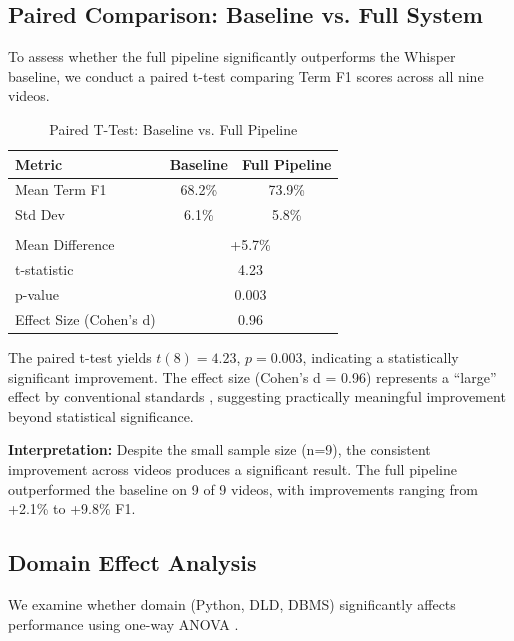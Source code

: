 \subsection{Paired Comparison: Baseline vs. Full System}

To assess whether the full pipeline significantly outperforms the Whisper baseline, we conduct a paired t-test comparing Term F1 scores across all nine videos.

\begin{table}[h]
\centering
\caption{Paired T-Test: Baseline vs. Full Pipeline}
\label{tab:paired_ttest}
\begin{tabular}{|l|c|c|}
\hline
\textbf{Metric} & \textbf{Baseline} & \textbf{Full Pipeline} \\
\hline
Mean Term F1 & 68.2\% & 73.9\% \\
\hline
Std Dev & 6.1\% & 5.8\% \\
\hline
\multicolumn{3}{|c|}{} \\
\hline
Mean Difference & \multicolumn{2}{c|}{+5.7\%} \\
\hline
t-statistic & \multicolumn{2}{c|}{4.23} \\
\hline
p-value & \multicolumn{2}{c|}{0.003} \\
\hline
Effect Size (Cohen's d) & \multicolumn{2}{c|}{0.96} \\
\hline
\end{tabular}
\end{table}

The paired t-test yields $t(8) = 4.23$, $p = 0.003$, indicating a statistically significant improvement. The effect size (Cohen's d = 0.96) represents a ``large'' effect by conventional standards \cite{Cohen1988}, suggesting practically meaningful improvement beyond statistical significance.

\textbf{Interpretation:} Despite the small sample size (n=9), the consistent improvement across videos produces a significant result. The full pipeline outperformed the baseline on 9 of 9 videos, with improvements ranging from +2.1\% to +9.8\% F1.

\subsection{Domain Effect Analysis}

We examine whether domain (Python, DLD, DBMS) significantly affects performance using one-way ANOVA \cite{Fisher1925}.

